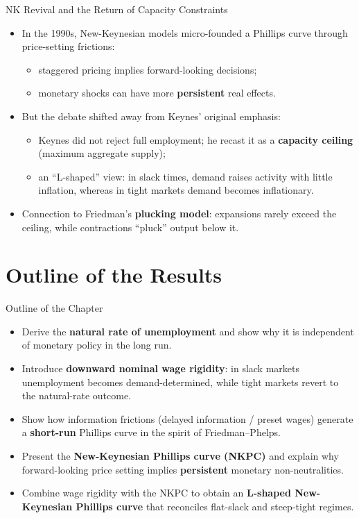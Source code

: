 \documentclass[11pt,aspectratio=169]{beamer}
\begin{document}
\begin{frame}{NK Revival and the Return of Capacity Constraints}
\small
\begin{itemize}
  \item In the 1990s, New-Keynesian models micro-founded a Phillips curve through price-setting frictions:
  \begin{itemize}
    \item staggered pricing implies forward-looking decisions;
    \item monetary shocks can have more \textbf{persistent} real effects.
  \end{itemize}
  \item But the debate shifted away from Keynes’ original emphasis:
  \begin{itemize}
    \item Keynes did not reject full employment; he recast it as a \textbf{capacity ceiling} (maximum aggregate supply);
    \item an \enquote{L-shaped} view: in slack times, demand raises activity with little inflation, whereas in tight markets demand becomes inflationary.
  \end{itemize}
  \item Connection to Friedman’s \textbf{plucking model}: expansions rarely exceed the ceiling, while contractions \enquote{pluck} output below it.
\end{itemize}
\end{frame}
\section{Outline of the Results}

\begin{frame}{Outline of the Chapter}
\small
\begin{itemize}
  \item Derive the \textbf{natural rate of unemployment} and show why it is independent of monetary policy in the long run.
  \item Introduce \textbf{downward nominal wage rigidity}: in slack markets unemployment becomes demand-determined, while tight markets revert to the natural-rate outcome.
  \item Show how information frictions (delayed information / preset wages) generate a \textbf{short-run} Phillips curve in the spirit of Friedman--Phelps.
  \item Present the \textbf{New-Keynesian Phillips curve (NKPC)} and explain why forward-looking price setting implies \textbf{persistent} monetary non-neutralities.
  \item Combine wage rigidity with the NKPC to obtain an \textbf{L-shaped New-Keynesian Phillips curve} that reconciles flat-slack and steep-tight regimes.
\end{itemize}
\end{frame}
\end{document}
